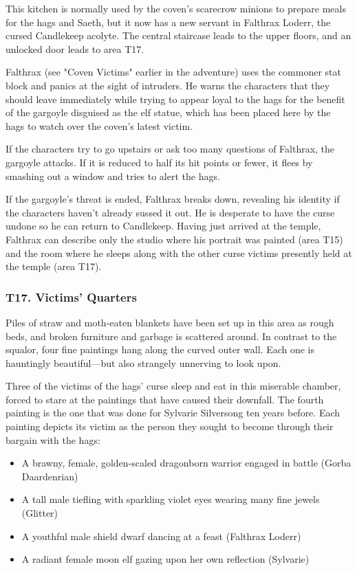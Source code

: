 \documentclass[10pt,a4paper,twoside,bg=print,twocolumn,openany,nodeprecatedcode]{dndbook}
\begin{document}
This kitchen is normally used by the coven's scarecrow minions to prepare meals for the hags and Saeth, but it now has a new servant in Falthrax Loderr, the cursed Candlekeep acolyte. The central staircase leads to the upper floors, and an unlocked door leads to area T17.

Falthrax (see "Coven Victims" earlier in the adventure) uses the commoner stat block and panics at the sight of intruders. He warns the characters that they should leave immediately while trying to appear loyal to the hags for the benefit of the gargoyle disguised as the elf statue, which has been placed here by the hags to watch over the coven's latest victim.

If the characters try to go upstairs or ask too many questions of Falthrax, the gargoyle attacks. If it is reduced to half its hit points or fewer, it flees by smashing out a window and tries to alert the hags.

If the gargoyle's threat is ended, Falthrax breaks down, revealing his identity if the characters haven't already sussed it out. He is desperate to have the curse undone so he can return to Candlekeep. Having just arrived at the temple, Falthrax can describe only the studio where his portrait was painted (area T15) and the room where he sleeps along with the other curse victims presently held at the temple (area T17).

\subsubsection{T17. Victims' Quarters}
\begin{DndReadAloud}{}
Piles of straw and moth-eaten blankets have been set up in this area as rough beds, and broken furniture and garbage is scattered around. In contrast to the squalor, four fine paintings hang along the curved outer wall. Each one is hauntingly beautiful—but also strangely unnerving to look upon.

\end{DndReadAloud}

Three of the victims of the hags' curse sleep and eat in this miserable chamber, forced to stare at the paintings that have caused their downfall. The fourth painting is the one that was done for Sylvarie Silversong ten years before. Each painting depicts its victim as the person they sought to become through their bargain with the hags:


\begin{itemize}
\item A brawny, female, golden-scaled dragonborn warrior engaged in battle (Gorba Daardenrian)
\item A tall male tiefling with sparkling violet eyes wearing many fine jewels (Glitter)
\item A youthful male shield dwarf dancing at a feast (Falthrax Loderr)
\item A radiant female moon elf gazing upon her own reflection (Sylvarie)
\end{itemize}
\end{document}
